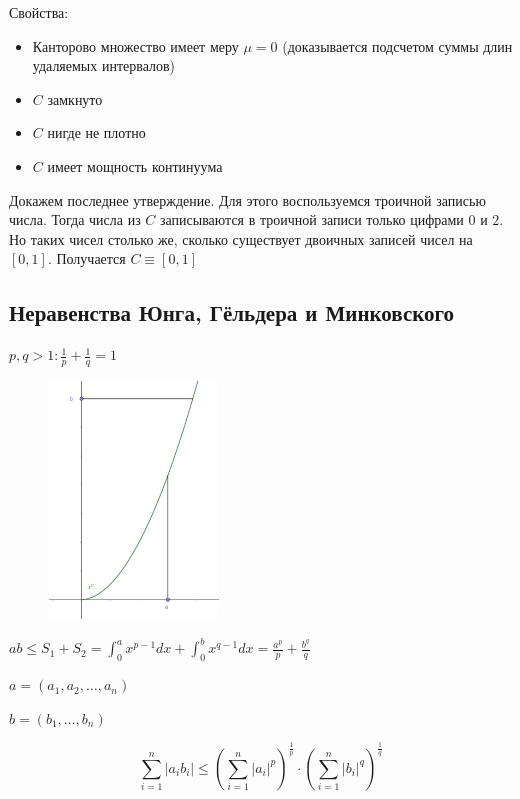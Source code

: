 Свойства:
\begin{itemize}
  \item Канторово множество имеет меру $\mu = 0$ (доказывается подсчетом суммы длин удаляемых интервалов)
  \item $C$ замкнуто
  \item $C$ нигде не плотно
  \item $C$ имеет мощность континуума
\end{itemize}

Докажем последнее утверждение. Для этого воспользуемся троичной записью числа.
Тогда числа из $C$ записываются в троичной записи только цифрами $0$ и $2$. Но таких чисел столько же, сколько существует двоичных записей
чисел на $[0, 1]$. Получается $C \equiv [0, 1]$



\subsection{Неравенства Юнга, Гёльдера и Минковского}

$p, q > 1 : \frac{1}{p} + \frac{1}{q} = 1$

\begin{figure}
\includegraphics[width = 0.4\textwidth]{images/ung.JPG}
\end{figure}

\begin{theorem}[Юнг]
  $ab \leq S_1 + S_2 = \int_{0}^{a} x^{p-1} dx + \int_0^b x^{q-1} dx = \frac{a^p}{p} + \frac{b^q}{q}$
\end{theorem}

\begin{theorem}[Гёльдер]
  $a = (a_1, a_2, \dots, a_n)$

  $b = (b_1, \dots, b_n)$

  $$\sum_{i = 1}^{n} |a_ib_i| \leq \left(\sum_{i=1}^n |a_i|^p \right)^{\frac{1}{p}} \cdot \left(\sum_{i=1}^n |b_i|^q \right)^{\frac{1}{q}}$$
\end{theorem}

